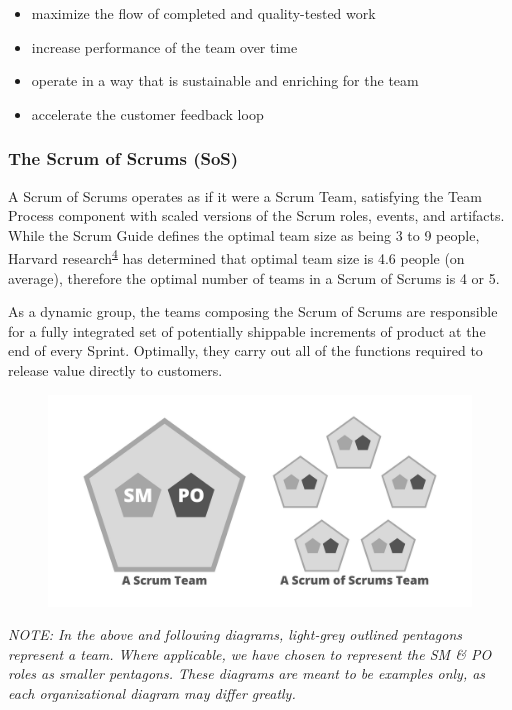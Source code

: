 \documentclass[12pt,a4paper,parskip=full]{scrartcl}
\begin{document}
\begin{itemize}
\itemsep1pt\parskip0pt
\item
  maximize the flow of completed and quality-tested work
\item
  increase performance of the team over time
\item
  operate in a way that is sustainable and enriching for the team
\item
  accelerate the customer feedback loop
\end{itemize}

\subsubsection{The Scrum of Scrums (SoS)}\label{the-scrum-of-scrums}

A Scrum of Scrums operates as if it were a Scrum Team, satisfying the
Team Process component with scaled versions of the Scrum roles, events,
and artifacts. While the Scrum Guide defines the optimal team size as
being 3 to 9 people, Harvard
research\textsuperscript{\hyperref[citation4]{4}} has determined that
optimal team size is 4.6 people (on average), therefore the optimal
number of teams in a Scrum of Scrums is 4 or 5.

As a dynamic group, the teams composing the Scrum of Scrums are
responsible for a fully integrated set of potentially shippable
increments of product at the end of every Sprint. Optimally, they carry
out all of the functions required to release value directly to
customers.

\begin{figure}
    \centering
    \includegraphics[scale=0.15]{1.png}
\end{figure}


\emph{NOTE: In the above and following diagrams, light-grey outlined
pentagons represent a team. Where applicable, we have chosen to
represent the SM \& PO roles as smaller pentagons. These diagrams are
meant to be examples only, as each organizational diagram may differ
greatly.}
\end{document}
